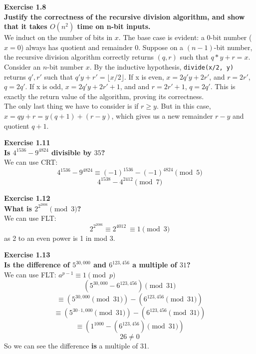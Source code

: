 \documentclass{article}
\newenvironment{problem}[2][Exercise]
    { \begin{mdframed}[backgroundcolor=gray!20] \textbf{#1 #2} \\}
    {  \end{mdframed}}
\begin{document}
\begin{problem}{1.8}
    \textbf{Justify the correctness of the recursive division algorithm, and show that it takes $O(n^2)$ time on n-bit inputs.}
    \\
    We induct on the number of bits in $x$. The base case is evident: a 0-bit number ($x = 0$) always has quotient and remainder 0. Suppose on a $(n - 1)$-bit number, the recursive division algorithm correctly returns $(q, r)$ such that $q * y + r = x$. 
    \\
    Consider an $n$-bit number $x$. By the inductive hypothesis, \texttt{divide(x/2, y)} returns $q', r'$ such that $q'y + r' = \lfloor x/2 \rfloor$.
    If x is even, $x = 2q'y + 2r'$, and $r = 2r'$, $q = 2q'$. If x is odd, $x = 2q'y + 2r' + 1$, and and $r = 2r' + 1$, $q = 2q'$. This is exactly the return value of the algorithm, proving its correctness.
    \\
    The only last thing we have to consider is if $r \geq y$. But in this case, $x = qy + r = y(q + 1) + (r - y)$, which gives us a new remainder $r - y$ and quotient $q + 1$.
\end{problem}

\begin{problem}{1.11}
    \textbf{Is $4^{1536} - 9^{4824}$ divisible by $35$?}
    \\
    We can use CRT:
    \[
        4^{1536} - 9^{4824} \equiv (-1)^{1536} - (-1)^{4824} \pmod 5
    \]
    \[
        4^{1538} - 4^{2412} \pmod 7
    \]
\end{problem}

\begin{problem}{1.12}
    \textbf{What is $2^{2^{2006}} \pmod 3$?}
    \\
    We can use FLT:
    \[
        2^{2^{2006}} \equiv 2^{4012} \ \boxed{\equiv 1 \pmod 3}
    \]
    as 2 to an even power is 1 in mod 3.
\end{problem}

\begin{problem}{1.13}
    \textbf{Is the difference of $5^{30,000}$ and $6^{123,456}$ a multiple of $31$?}
    \\
    We can use FLT: $a^{p-1}\equiv 1 \pmod p$
    \[
        (5^{30,000} - 6^{123,456}) \pmod{31}
    \]
    \[
        \equiv (5^{30,000} \pmod{31}) - (6^{123,456} \pmod{31})
    \]
    \[
        \equiv (5^{30\cdot 1,000} \pmod{31}) - (6^{123,456} \pmod{31})
    \]
    \[
        \equiv (1^{1000} - (6^{123,456}) \pmod{31})
    \]
    \[
        26 \neq 0
    \]
    So we can see the difference \textbf{is} a multiple of 31.
\end{problem}
\end{document}
